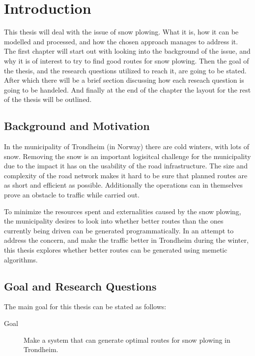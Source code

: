 \chapter{Introduction}
\label{cha:introduction}

This thesis will deal with the issue of snow plowing. What it is, how it can be modelled and processed, and how the chosen approach manages to address it. The first chapter will start out with looking into the background of the issue, and why it is of interest to try to find good routes for snow plowing. Then the goal of the thesis, and the research questions utilized to reach it, are going to be stated. After which there will be a brief section discussing how each reseach question is going to be handeled. And finally at the end of the chapter the layout for the rest of the thesis will be outlined.

\section{Background and Motivation}

In the municipality of Trondheim (in Norway) there are cold winters, with lots of snow. Removing the snow is an important logisitcal challenge for the municipality due to the impact it has on the usability of the road infrastructure. The size and complexity of the road network makes it hard to be sure that planned routes are as short and efficient as possible. Additionally the operations can in themselves prove an obstacle to traffic while carried out.

To minimize the resources spent and externalities caused by the snow plowing, the municipality desires to look into whether better routes than the ones currently being driven can be generated programmatically. In an attempt to address the concern, and make the traffic better in Trondheim during the winter, this thesis explores whether better routes can be generated using memetic algorithms.

\section{Goal and Research Questions}
\label{sec:goal_and_research_questions}

The main goal for this thesis can be stated as follows:

\begin{description}
	\item [Goal] Make a system that can generate optimal routes for snow plowing in Trondheim.
\end{description}

